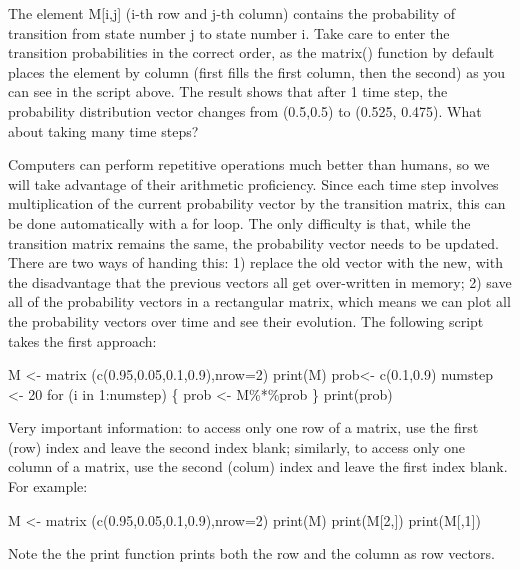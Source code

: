 \documentclass[
  letterpaper,
  DIV=11,
  numbers=noendperiod]{scrreprt}
\newenvironment{Shaded}{\begin{snugshade}}{\end{snugshade}}
\newcommand{\NormalTok}[1]{\textcolor[rgb]{0.00,0.23,0.31}{#1}}
\begin{document}
The element M{[}i,j{]} (i-th row and j-th column) contains the
probability of transition from state number j to state number i. Take
care to enter the transition probabilities in the correct order, as the
matrix() function by default places the element by column (first fills
the first column, then the second) as you can see in the script above.
The result shows that after 1 time step, the probability distribution
vector changes from (0.5,0.5) to (0.525, 0.475). What about taking many
time steps?

Computers can perform repetitive operations much better than humans, so
we will take advantage of their arithmetic proficiency. Since each time
step involves multiplication of the current probability vector by the
transition matrix, this can be done automatically with a for loop. The
only difficulty is that, while the transition matrix remains the same,
the probability vector needs to be updated. There are two ways of
handing this: 1) replace the old vector with the new, with the
disadvantage that the previous vectors all get over-written in memory;
2) save all of the probability vectors in a rectangular matrix, which
means we can plot all the probability vectors over time and see their
evolution. The following script takes the first approach:

\begin{Shaded}
\begin{Highlighting}[]
\NormalTok{M \textless{}{-} matrix (c(0.95,0.05,0.1,0.9),nrow=2)}
\NormalTok{print(M)}
\NormalTok{prob\textless{}{-} c(0.1,0.9)}
\NormalTok{numstep \textless{}{-} 20}
\NormalTok{for (i in 1:numstep) \{}
\NormalTok{    prob \textless{}{-} M\%*\%prob}
\NormalTok{\}}
\NormalTok{print(prob)}
\end{Highlighting}
\end{Shaded}

Very important information: to access only one row of a matrix, use the
first (row) index and leave the second index blank; similarly, to access
only one column of a matrix, use the second (colum) index and leave the
first index blank. For example:

\begin{Shaded}
\begin{Highlighting}[]
\NormalTok{M \textless{}{-} matrix (c(0.95,0.05,0.1,0.9),nrow=2)}
\NormalTok{print(M)}
\NormalTok{print(M[2,])}
\NormalTok{print(M[,1])}
\end{Highlighting}
\end{Shaded}

Note the the print function prints both the row and the column as row
vectors.
\end{document}
